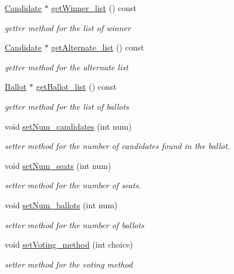 \begin{DoxyCompactItemize}
\hyperlink{classCandidate}{Candidate} $\ast$ \hyperlink{classElection_a9844007dba475a45520a0d1eac47b0b9}{get\+Winner\+\_\+list} () const 
\begin{DoxyCompactList}\small\item\em getter method for the list of winner \end{DoxyCompactList}\item 
\hyperlink{classCandidate}{Candidate} $\ast$ \hyperlink{classElection_a5b2af84308132646af8e619cc35cd717}{get\+Alternate\+\_\+list} () const 
\begin{DoxyCompactList}\small\item\em getter method for the alternate list \end{DoxyCompactList}\item 
\hyperlink{classBallot}{Ballot} $\ast$ \hyperlink{classElection_a8f61e0da88edce12cd5357a773249b49}{get\+Ballot\+\_\+list} () const 
\begin{DoxyCompactList}\small\item\em getter method for the list of ballots \end{DoxyCompactList}\item 
void \hyperlink{classElection_aa397a20bc52d99a497fe1344b0fd01d3}{set\+Num\+\_\+candidates} (int num)
\begin{DoxyCompactList}\small\item\em setter method for the number of candidates found in the ballot. \end{DoxyCompactList}\item 
void \hyperlink{classElection_a3ceb8be4c474c4f3456c44d63edc95b2}{set\+Num\+\_\+seats} (int num)
\begin{DoxyCompactList}\small\item\em setter method for the number of seats. \end{DoxyCompactList}\item 
void \hyperlink{classElection_ad493684ee11f3fabe54b19ceaece3b0b}{set\+Num\+\_\+ballots} (int num)
\begin{DoxyCompactList}\small\item\em setter method for the number of ballots \end{DoxyCompactList}\item 
void \hyperlink{classElection_a7b0f1f75f8adce2a6c27ddfa26d5cb45}{set\+Voting\+\_\+method} (int choice)
\begin{DoxyCompactList}\small\item\em setter method for the voting method \end{DoxyCompactList}\item 

\end{DoxyCompactItemize}
